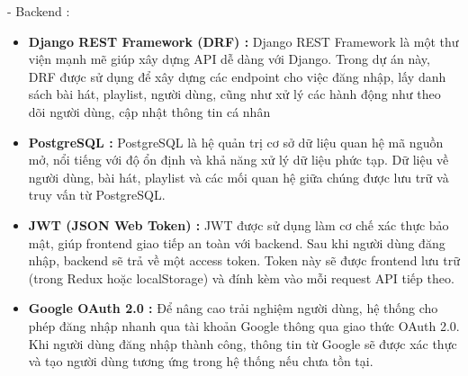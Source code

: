 \documentclass{article}
\begin{document}
- Backend :

\begin{itemize}
\item
  \textbf{Django REST Framework (DRF) :} Django REST Framework là một
  thư viện mạnh mẽ giúp xây dựng API dễ dàng với Django. Trong dự án
  này, DRF được sử dụng để xây dựng các endpoint cho việc đăng nhập, lấy
  danh sách bài hát, playlist, người dùng, cũng như xử lý các hành động
  như theo dõi người dùng, cập nhật thông tin cá nhân
\item
  \textbf{PostgreSQL :} PostgreSQL là hệ quản trị cơ sở dữ liệu quan hệ
  mã nguồn mở, nổi tiếng với độ ổn định và khả năng xử lý dữ liệu phức
  tạp. Dữ liệu về người dùng, bài hát, playlist và các mối quan hệ giữa
  chúng được lưu trữ và truy vấn từ PostgreSQL.
\item
  \textbf{JWT (JSON Web Token) :} JWT được sử dụng làm cơ chế xác thực
  bảo mật, giúp frontend giao tiếp an toàn với backend. Sau khi người
  dùng đăng nhập, backend sẽ trả về một access token. Token này sẽ được
  frontend lưu trữ (trong Redux hoặc localStorage) và đính kèm vào mỗi
  request API tiếp theo.
\item
  \textbf{Google OAuth 2.0 :} Để nâng cao trải nghiệm người dùng, hệ
  thống cho phép đăng nhập nhanh qua tài khoản Google thông qua giao
  thức OAuth 2.0. Khi người dùng đăng nhập thành công, thông tin từ
  Google sẽ được xác thực và tạo người dùng tương ứng trong hệ thống nếu
  chưa tồn tại.
\end{itemize}
\end{document}

